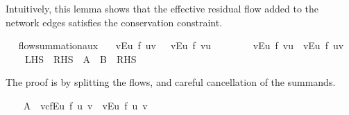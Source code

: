 \begin{isabellebody}
\begin{isamarkuptext}
  Intuitively, this lemma shows that the effective residual flow added to the 
  network edges satisfies the conservation constraint.%
\end{isamarkuptext}\isamarkuptrue%
\ \isamarkupfalse%
\ flow{\isacharunderscore}summation{\isacharunderscore}aux{\isacharcolon}\isanewline
\ \ \ {\isachardoublequoteopen}{\isacharparenleft}{\isasymSum}v{\isasymin}E{\isacharbackquote}{\isacharbackquote}{\isacharbraceleft}u{\isacharbraceright}{\isachardot}\ f{\isacharprime}\ {\isacharparenleft}u{\isacharcomma}v{\isacharparenright}{\isacharparenright}\ \ {\isacharminus}\ {\isacharparenleft}{\isasymSum}v{\isasymin}E{\isacharbackquote}{\isacharbackquote}{\isacharbraceleft}u{\isacharbraceright}{\isachardot}\ f{\isacharprime}\ {\isacharparenleft}v{\isacharcomma}u{\isacharparenright}{\isacharparenright}\isanewline
\ \ \ \ \ \ \ {\isacharequal}\ {\isacharparenleft}{\isasymSum}v{\isasymin}E{\isasyminverse}{\isacharbackquote}{\isacharbackquote}{\isacharbraceleft}u{\isacharbraceright}{\isachardot}\ f{\isacharprime}\ {\isacharparenleft}v{\isacharcomma}u{\isacharparenright}{\isacharparenright}\ {\isacharminus}\ {\isacharparenleft}{\isasymSum}v{\isasymin}E{\isasyminverse}{\isacharbackquote}{\isacharbackquote}{\isacharbraceleft}u{\isacharbraceright}{\isachardot}\ f{\isacharprime}\ {\isacharparenleft}u{\isacharcomma}v{\isacharparenright}{\isacharparenright}{\isachardoublequoteclose}\isanewline
\ \ \ {\isacharparenleft}\ {\isachardoublequoteopen}{\isacharquery}LHS\ {\isacharequal}\ {\isacharquery}RHS{\isachardoublequoteclose}\ \ {\isachardoublequoteopen}{\isacharquery}A\ {\isacharminus}\ {\isacharquery}B\ {\isacharequal}\ {\isacharquery}RHS{\isachardoublequoteclose}{\isacharparenright}\isanewline
%
\isadelimproof
%
\endisadelimproof
%
\isatagproof
{}\isamarkupfalse%
\ {\isacharminus}%
\begin{isamarkuptext}%
The proof is by splitting the flows, and careful 
    cancellation of the summands.%
\end{isamarkuptext}\isamarkuptrue%
\ \ \isamarkupfalse%
\ {\isachardoublequoteopen}{\isacharquery}A\ {\isacharequal}\ {\isacharparenleft}{\isasymSum}v{\isasymin}cf{\isachardot}E{\isacharbackquote}{\isacharbackquote}{\isacharbraceleft}u{\isacharbraceright}{\isachardot}\ f{\isacharprime}\ {\isacharparenleft}u{\isacharcomma}\ v{\isacharparenright}{\isacharparenright}\ {\isacharminus}\ {\isacharparenleft}{\isasymSum}v{\isasymin}E{\isasyminverse}{\isacharbackquote}{\isacharbackquote}{\isacharbraceleft}u{\isacharbraceright}{\isachardot}\ f{\isacharprime}\ {\isacharparenleft}u{\isacharcomma}\ v{\isacharparenright}{\isacharparenright}{\isachardoublequoteclose}\isanewline

\end{isabellebody}
